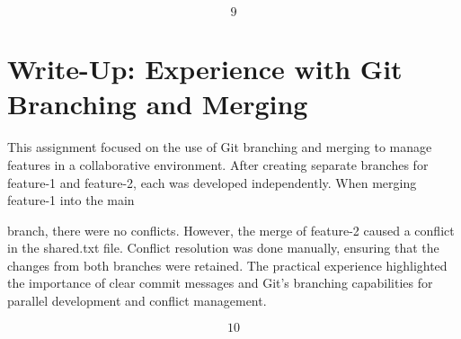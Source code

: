 \documentclass{article} %
\begin{document}
\noindent 

\noindent 

\noindent 

\noindent 

\noindent 
\[9\] 


\noindent 
\section{Write-Up: Experience with Git Branching and Merging}

\noindent \textbf{}

\noindent This assignment focused on the use of Git branching and merging to manage features in a collaborative environment. After creating separate branches for feature-1 and feature-2, each was developed independently. When merging feature-1 into the main

\noindent branch, there were no conflicts. However, the merge of feature-2 caused a conflict in the shared.txt file. Conflict resolution was done manually, ensuring that the changes from both branches were retained. The practical experience highlighted the importance of clear commit messages and Git's branching capabilities for parallel development and conflict management.

\noindent 

\noindent 

\noindent 

\noindent 

\noindent 

\noindent 

\noindent 

\noindent 

\noindent 

\noindent 

\noindent 

\noindent 

\noindent 

\noindent 

\noindent 

\noindent 

\noindent 

\noindent 

\noindent 

\noindent 

\noindent 

\noindent 

\noindent 

\noindent 

\noindent 

\noindent 

\noindent 

\noindent 

\noindent 

\noindent 

\noindent 

\noindent 
\[10\] 
\end{document}
